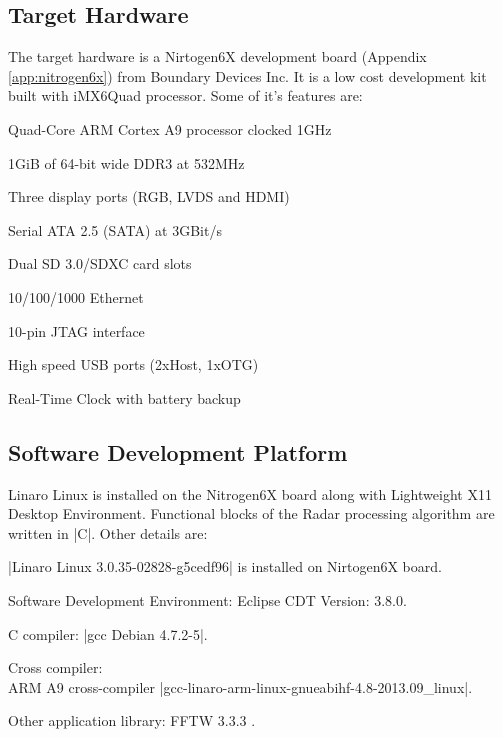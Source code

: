 \subsection{Target Hardware}
\label{ss:bg_related_work:hw}
The target hardware is a Nirtogen6X development board (Appendix \ref{app:nitrogen6x}) from Boundary Devices Inc. It is a low cost development kit built with iMX6Quad processor. Some of it's features are:
\begin{compactitem} 
	\item Quad-Core ARM Cortex A9 processor clocked 1GHz
	\item 1GiB of 64-bit wide DDR3 at 532MHz
	\item Three display ports (RGB, LVDS and HDMI)
	\item Serial ATA 2.5 (SATA) at 3GBit/s
	\item Dual SD 3.0/SDXC card slots
	\item 10/100/1000 Ethernet
	\item 10-pin JTAG interface
	\item High speed USB ports (2xHost, 1xOTG)
	\item Real-Time Clock with battery backup
\end{compactitem}

\subsection{Software Development Platform}
\label{ss:bg_related_work:sw}
Linaro Linux is installed on the Nitrogen6X board along with Lightweight X11 Desktop Environment. Functional blocks of the Radar processing algorithm are written in \bverb|C|. Other details are:

\begin{compactitem} 
	\item \bverb|Linaro Linux 3.0.35-02828-g5cedf96| is installed on Nirtogen6X board.
	\item Software Development Environment: Eclipse CDT Version: 3.8.0.
	\item C compiler: \bverb|gcc Debian 4.7.2-5|.
	\item Cross compiler: \\ARM A9 cross-compiler \bverb|gcc-linaro-arm-linux-gnueabihf-4.8-2013.09_linux|.
	\item Other application library: FFTW 3.3.3 \cite{fftw}. \\
\end{compactitem} 

